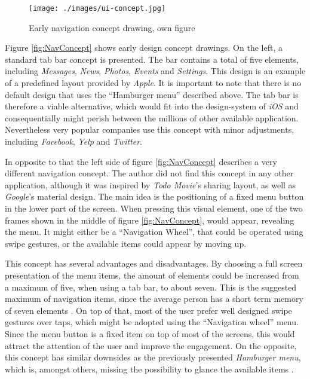 \begin{figure}[h]
  	\centering
  	\texttt{[image: ./images/ui-concept.jpg]}
  	\caption{Early navigation concept drawing, own figure}
	\label{fig:NavConcept}
\end{figure}

Figure \vref{fig:NavConcept} shows early design concept drawings. On the left, a standard tab bar concept is presented. The bar contains a total of five elements, including \emph{Messages}, \emph{News}, \emph{Photos}, \emph{Events} and \emph{Settings}. This design is an example of a predefined layout provided by \emph{Apple}. It is important to note that there is no default design that uses the \enquote{Hamburger menu} described above. The tab bar is therefore a viable alternative, which would fit into the design-system of \emph{iOS} and consequentially might perish between the millions of other available application. Nevertheless very popular companies use this concept with minor adjustments, including \emph{Facebook}, \emph{Yelp} and \emph{Twitter}.

In opposite to that the left side of figure \vref{fig:NavConcept} describes a very different navigation concept. The author did not find this concept in any other application, although it was inspired by \emph{Todo Movie}'s sharing layout, as well as \emph{Google}'s material design. The main idea is the positioning of a fixed menu button in the lower part of the screen. When pressing this visual element, one of the two frames shown in the middle of figure \vref{fig:NavConcept}, would appear, revealing the menu. It might either be a \enquote{Navigation Wheel}, that could be operated using swipe gestures, or the available items could appear by moving up.

This concept has several advantages and disadvantages. By choosing a full screen presentation of the menu items, the amount of elements could be increased from a maximum of five, when using a tab bar, to about seven. This is the suggested maximum of navigation items, since the average person has a short term memory of seven elements \cite{Crestodina:2015aa}. On top of that, most of the user prefer well designed swipe gestures over taps, which might be adopted using the \enquote{Navigation wheel} menu. Since the menu button is a fixed item on top of most of the screens, this would attract the attention of the user and improve the engagement. On the opposite, this concept has similar downsides as the previously presented \emph{Hamburger menu}, which is, amongst others, missing the possibility to glance the available items \cite{Abreu:2014aa}.

